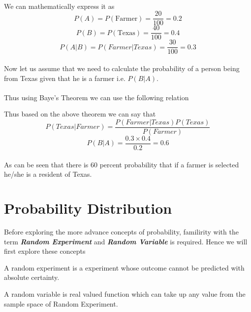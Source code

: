 \documentclass[twoside,12pt]{report}  %
\begin{document}
\\
We can mathematically express it as
$$ P(A) = P(\mbox{Farmer}) = \frac{20}{100} = 0.2 $$
$$ P(B) = P(\mbox{Texas}) = \frac{40}{100} = 0.4$$
$$ P(A | B) = P(Farmer|Texas) = \frac{30}{100} = 0.3 $$
\\
Now let us assume that we need to calculate the probability of a person being from Texas given that he is a farmer i.e. $P(B|A)$.
\\
\\
Thus using Baye's Theorem we can use the following relation
\begin{center}
\end{center}
\noindent
Thus based on the above theorem we can say that
$$ P(Texas|Farmer) = \frac{P(Farmer|Texas)P(Texas)}{P(Farmer)} $$
$$ P(B|A) = \frac{0.3 \times 0.4}{0.2} = 0.6 $$
\\
As can be seen that there is 60 percent probability that if a farmer is selected he/she is a resident of Texas.
\chapter{Probability Distribution}
\noindent
Before exploring the more advance concepts of probability, familirity with the term \textbf{\textit{Random Experiment}} and \textbf{\textit{Random Variable}} is required. Hence we will first explore these concepts
\\
\begin{tcolorbox}[colback=red!5!white, colframe=red!75!black, title = \textbf{Random Experiment}]
	A random experiment is a experiment whose outcome cannot be predicted with absolute certainty.
\end{tcolorbox}
\noindent
\break
\begin{tcolorbox}[colback=red!5!white, colframe=red!75!black, title = \textbf{Random Variable}]
	A random variable is real valued function which can take up any value from the sample space of Random Experiment. 
\end{tcolorbox}
\noindent
\\
\end{document}
